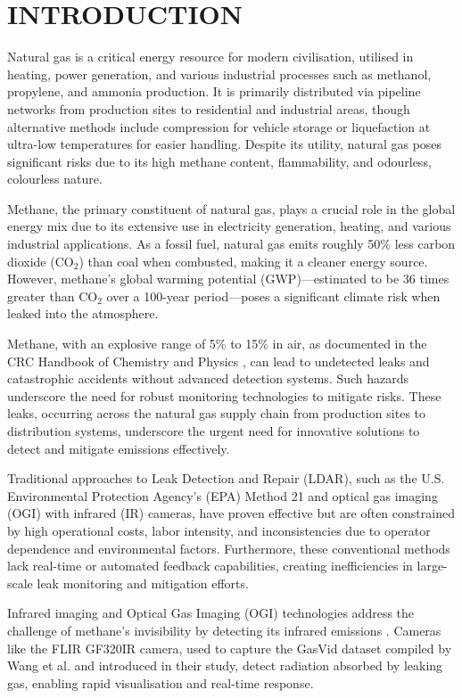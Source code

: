 \chapter{INTRODUCTION}

Natural gas is a critical energy resource for modern civilisation, utilised in heating, power generation, and various industrial processes such as methanol, propylene, and ammonia production. It is primarily distributed via pipeline networks from production sites to residential and industrial areas, though alternative methods include compression for vehicle storage or liquefaction at ultra-low temperatures for easier handling. Despite its utility, natural gas poses significant risks due to its high methane content, flammability, and odourless, colourless nature.

Methane, the primary constituent of natural gas, plays a crucial role in the global energy mix due to its extensive use in electricity generation, heating, and various industrial applications. As a fossil fuel, natural gas emits roughly 50\% less carbon dioxide (CO$_2$) than coal when combusted, making it a cleaner energy source. However, methane's global warming potential (GWP)—estimated to be 36 times greater than CO$_2$ over a 100-year period—poses a significant climate risk when leaked into the atmosphere.

Methane, with an explosive range of 5\% to 15\% in air, as documented in the CRC Handbook of Chemistry and Physics \cite{haynes2016crc}, can lead to undetected leaks and catastrophic accidents without advanced detection systems. Such hazards underscore the need for robust monitoring technologies to mitigate risks. These leaks, occurring across the natural gas supply chain from production sites to distribution systems, underscore the urgent need for innovative solutions to detect and mitigate emissions effectively.

Traditional approaches to Leak Detection and Repair (LDAR), such as the U.S. Environmental Protection Agency's (EPA) Method 21 and optical gas imaging (OGI) with infrared (IR) cameras, have proven effective but are often constrained by high operational costs, labor intensity, and inconsistencies due to operator dependence and environmental factors. Furthermore, these conventional methods lack real-time or automated feedback capabilities, creating inefficiencies in large-scale leak monitoring and mitigation efforts.

Infrared imaging and Optical Gas Imaging (OGI) technologies address the challenge of methane's invisibility by detecting its infrared emissions \cite{ravikumar2016optical}. Cameras like the FLIR GF320IR camera, used to capture the GasVid dataset compiled by Wang et al. \cite{wang2020machine} and introduced in their study, detect radiation absorbed by leaking gas, enabling rapid visualisation and real-time response.

